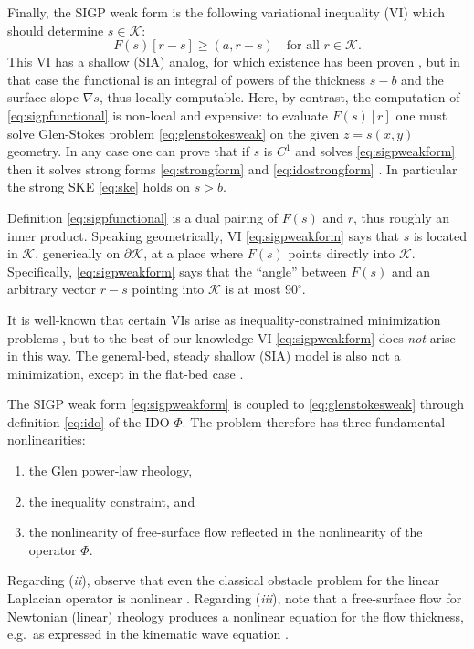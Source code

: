 \documentclass[letterpaper,final,12pt,reqno]{amsart}
\theoremstyle{claim}
\newcommand{\grad}{\nabla}
\newcommand{\ip}[2]{\left(#1,#2\right)}
\numberwithin{equation}{section}
\numberwithin{figure}{section}
\numberwithin{table}{section}
\numberwithin{theorem}{section}
\begin{document}
Finally, the SIGP weak form is the following variational inequality (VI) \cite{KinderlehrerStampacchia1980} which should determine $s\in\mathcal{K}$:
\begin{equation}
F(s)[r - s] \ge \ip{a}{r-s} \quad \text{for all $r \in \mathcal{K}$.}  \label{eq:sigpweakform}
\end{equation}
This VI has a shallow (SIA) analog, for which existence has been proven \cite{JouvetBueler2012}, but in that case the functional is an integral of powers of the thickness $s-b$ and the surface slope $\grad s$, thus locally-computable.  Here, by contrast, the computation of \eqref{eq:sigpfunctional} is non-local and expensive: to evaluate $F(s)[r]$ one must solve Glen-Stokes problem \eqref{eq:glenstokesweak} on the given $z=s(x,y)$ geometry.  In any case one can prove that if $s$ is $C^1$ and solves \eqref{eq:sigpweakform} then it solves strong forms \eqref{eq:strongform} and \eqref{eq:idostrongform} \cite{Bueler2021conservation}.  In particular the strong SKE \eqref{eq:ske} holds on $s>b$.

Definition \eqref{eq:sigpfunctional} is a dual pairing of $F(s)$ and $r$, thus roughly an inner product.  Speaking geometrically, VI \eqref{eq:sigpweakform} says that $s$ is located in $\mathcal{K}$, generically on $\partial\mathcal{K}$, at a place where $F(s)$ points directly into $\mathcal{K}$.  Specifically, \eqref{eq:sigpweakform} says that the ``angle'' between $F(s)$ and an arbitrary vector $r-s$ pointing into $\mathcal{K}$ is at most $90^\circ$.

It is well-known that certain VIs arise as inequality-constrained minimization problems \cite{GraeserKornhuber2009,KinderlehrerStampacchia1980}, but to the best of our knowledge VI \eqref{eq:sigpweakform} does \emph{not} arise in this way.  The general-bed, steady shallow (SIA) model is also not a minimization, except in the flat-bed case \cite{JouvetBueler2012}.

The SIGP weak form \eqref{eq:sigpweakform} is coupled to \eqref{eq:glenstokesweak} through definition \eqref{eq:ido} of the IDO $\Phi$.  The problem therefore has three fundamental nonlinearities:
\renewcommand{\labelenumi}{(\emph{\roman{enumi}})}
\begin{enumerate}
\item the Glen power-law rheology,
\item the inequality constraint, and
\item the nonlinearity of free-surface flow reflected in the nonlinearity of the operator $\Phi$.
\end{enumerate}
Regarding (\emph{ii}), observe that even the classical obstacle problem for the linear Laplacian operator is nonlinear \cite{KinderlehrerStampacchia1980}.  Regarding (\emph{iii}), note that a free-surface flow for Newtonian (linear) rheology produces a nonlinear equation for the flow thickness, e.g.~as expressed in the kinematic wave equation \cite{Ockendonetal2003}.
\end{document}
